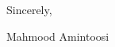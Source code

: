\documentclass[10pt]{article}
\begin{document}




\bigskip %

Sincerely,


Mahmood Amintoosi

 

\end{document}
